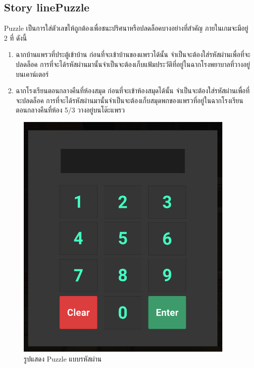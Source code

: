\subsection{\ifenglish Story line\else Puzzle\fi }
Puzzle เป็นการใส่ตัวเลขให้ถูกต้องเพื่อชนะปริศนาหรือปลดล็อคบางอย่างที่สำคัญ ภายในเกมจะมีอยู่ 2 ที่ ดังนี้
\begin{enumerate}
    \item ฉากบ้านแพรวที่ประตู้เข้าบ้าน ก่อนที่จะเข้าบ้านของแพรวได้นั้น จำเป็นจะต้องใส่รหัสผ่านเพื่อที่จะปลดล็อค การที่จะได้รหัสผ่านมานั้นจำเป็นจะต้องเก็บแฟ้มประวัติที่อยู่ในฉากโรงพยาบาลที่วางอยู่บนเคาน์เตอร์
    \item ฉากโรงเรียนตอนกลางคืนที่ห้องสมุด ก่อนที่จะเข้าห้องสมุดได้นั้น จำเป็นจะต้องใส่รหัสผ่านเพื่อที่จะปลดล็อค การที่จะได้รหัสผ่านมานั้นจำเป็นจะต้องเก็บสมุดพกของแพรวที่อยู่ในฉากโรงเรียนตอนกลางคืนที่ห้อง 5/3 วางอยู่บนโต๊ะแพรว
\end{enumerate}
\begin{figure}[h]
    \centering
    \includegraphics[scale=0.5]{Images/Password Image.png}
    \caption{รูปแสดง Puzzle แบบรหัสผ่าน}
\end{figure}


